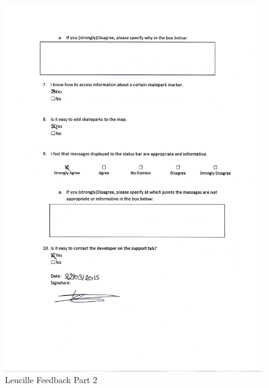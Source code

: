 \begin{figure}[H]
    \includegraphics[width=\textwidth]{./Evaluation/images/LeucilleFeedback2.pdf}
    \caption{Leucille Feedback Part 2} \label{fig:LeucilleFeedback2}
\end{figure}

